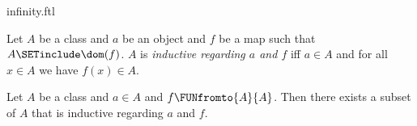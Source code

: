 \documentclass{naproche-library}
\begin{document}
\begin{smodule}[title=The Infinity Axiom]{infinity.ftl}

\begin{definition}[forthel,id=FOUNDATIONS_10_298374925738210]
  Let $A$ be a class and $a$ be an object and $f$ be a map such that $A \SETinclude \dom(f)$.
  $A$ is \emph{inductive regarding $a$ and $f$} iff $a \in A$ and for all $x \in A$ we have $f(x) \in A$.
\end{definition}

\begin{axiom}[forthel,title=Infinity Axiom,id=FOUNDATIONS_10_367388832825344]
  Let $A$ be a class and $a \in A$ and $f \FUNfromto{A}{A}$.
  Then there exists a subset of $A$ that is inductive regarding $a$ and $f$.
\end{axiom}
\end{smodule}
\end{document}
